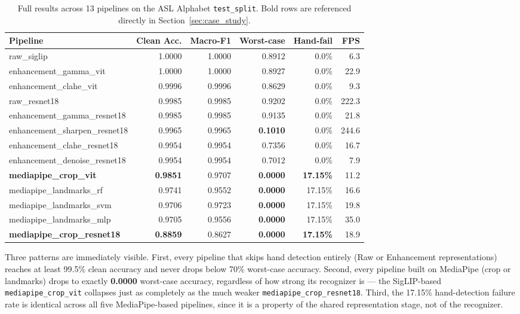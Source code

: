 \documentclass[11pt,a4paper]{article}
\newcommand{\codepath}[1]{\texttt{\small #1}}
\newcommand{\neg}[1]{\textcolor{red!60!black}{\textbf{#1}}}
\begin{document}
\begin{table}[H]
\centering
\caption{Full results across 13 pipelines on the ASL Alphabet \codepath{test\_split}.
  Bold rows are referenced directly in Section~\ref{sec:case_study}.}
\label{tab:summary_results}
\small
\begin{adjustbox}{max width=\textwidth}
\begin{tabular}{lrrrrr}
\toprule
\rowcolor{headerblue}
Pipeline & Clean Acc. & Macro-F1 & Worst-case & Hand-fail & FPS \\
\midrule
raw\_siglip                    & 1.0000 & 1.0000 & 0.8912 & 0.0\%   & 6.3   \\
enhancement\_gamma\_vit         & 1.0000 & 1.0000 & 0.8927 & 0.0\%   & 22.9  \\
enhancement\_clahe\_vit         & 0.9996 & 0.9996 & 0.8629 & 0.0\%   & 9.3   \\
raw\_resnet18                  & 0.9985 & 0.9985 & 0.9202 & 0.0\%   & 222.3 \\
enhancement\_gamma\_resnet18    & 0.9985 & 0.9985 & 0.9135 & 0.0\%   & 21.8  \\
enhancement\_sharpen\_resnet18  & 0.9965 & 0.9965 & \neg{0.1010} & 0.0\%   & 244.6 \\
enhancement\_clahe\_resnet18    & 0.9954 & 0.9954 & 0.7356 & 0.0\%   & 16.7  \\
enhancement\_denoise\_resnet18  & 0.9954 & 0.9954 & 0.7012 & 0.0\%   & 7.9   \\
\rowcolor{lightred}
\textbf{mediapipe\_crop\_vit}   & \textbf{0.9851} & 0.9707 & \neg{0.0000} & \textbf{17.15\%} & 11.2  \\
mediapipe\_landmarks\_rf       & 0.9741 & 0.9552 & \neg{0.0000} & 17.15\% & 16.6  \\
mediapipe\_landmarks\_svm      & 0.9706 & 0.9723 & \neg{0.0000} & 17.15\% & 19.8  \\
mediapipe\_landmarks\_mlp      & 0.9705 & 0.9556 & \neg{0.0000} & 17.15\% & 35.0  \\
\rowcolor{lightred}
\textbf{mediapipe\_crop\_resnet18} & \textbf{0.8859} & 0.8627 & \neg{0.0000} & \textbf{17.15\%} & 18.9  \\
\bottomrule
\end{tabular}
\end{adjustbox}
\end{table}

Three patterns are immediately visible. First, every pipeline that skips hand
detection entirely (Raw or Enhancement representations) reaches at least
99.5\% clean accuracy and never drops below 70\% worst-case accuracy. Second,
every pipeline built on MediaPipe (crop or landmarks) drops to exactly
\neg{0.0000} worst-case accuracy, regardless of how strong its recognizer is
--- the SigLIP-based \codepath{mediapipe\_crop\_vit} collapses just as
completely as the much weaker \codepath{mediapipe\_crop\_resnet18}. Third, the
17.15\% hand-detection failure rate is identical across all five
MediaPipe-based pipelines, since it is a property of the shared representation
stage, not of the recognizer.
\end{document}
